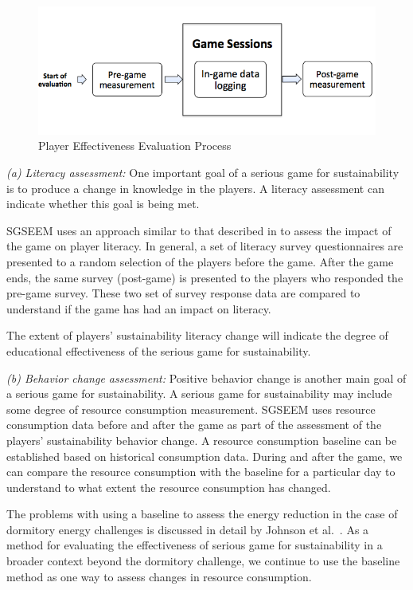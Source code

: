 \documentclass{sigchi}
\begin{document}
\begin{figure}[ht!]
  \center
  \includegraphics[width=\columnwidth]{pre-post-eval}
  \caption{Player Effectiveness Evaluation Process}
  \label{fig:pre-post-eval}
\end{figure}

\emph {(a) Literacy assessment:} One important goal of a serious
game for sustainability is to produce a change in knowledge in the
players. A literacy assessment can indicate whether this goal is being met.

SGSEEM uses an approach similar to that described in \cite{csdl2-10-08} to
assess the impact of the game on player literacy. In general, a set of literacy survey
questionnaires are presented to a random selection of the players 
before the game. After the game ends, the same survey
(post-game) is presented to the players who responded the
pre-game survey. These two set of survey response data are
compared to understand if the game has had an impact on literacy.

The extent of players' sustainability literacy change will indicate
the degree of educational effectiveness of the serious game for
sustainability.

\emph {(b) Behavior change assessment:} Positive behavior change is
another main goal of a serious game for sustainability. A serious game
for sustainability may include some degree of resource
consumption measurement. SGSEEM uses resource consumption data before and
after the game as part of the assessment of the
players' sustainability behavior change.  A resource consumption
baseline can be established based on historical
consumption data. During and after the game, we can compare the
resource consumption with the baseline for a particular day to
understand to what extent the resource consumption has changed.

The problems with using a baseline to assess the energy reduction in the case of dormitory
energy challenges is discussed in detail by Johnson et al.~\cite{csdl2-12-08}. As a method
for evaluating the effectiveness of serious game for sustainability in a broader context
beyond the dormitory challenge, we continue to use the baseline method as one way to
assess changes in resource consumption.
\end{document}
